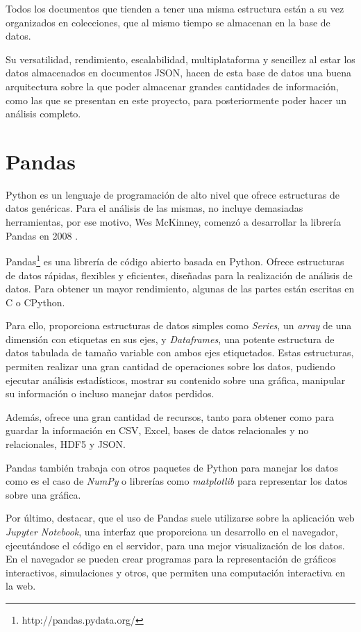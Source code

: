 \documentclass[a4paper, 12pt]{book}
\begin{document}
Todos los documentos que tienden a tener una misma estructura están a su vez organizados en colecciones, que al mismo tiempo se almacenan en la base de datos.

Su versatilidad, rendimiento, escalabilidad, multiplataforma y sencillez al estar los datos almacenados en documentos JSON, hacen de esta base de datos una buena arquitectura sobre la que  poder almacenar grandes cantidades de información, como las que se presentan en este proyecto, para posteriormente poder hacer un análisis completo.



\section{Pandas} 
\label{sec:seccion5}
Python es un lenguaje de programación de alto nivel que ofrece estructuras de datos genéricas. Para el análisis de las mismas, no incluye demasiadas herramientas, por ese motivo, Wes McKinney, comenzó a desarrollar la librería Pandas en 2008 \cite{mckinney2012python}.

Pandas\footnote{http://pandas.pydata.org/} es una librería de código abierto basada en Python. Ofrece estructuras de datos rápidas, flexibles y eficientes, diseñadas para la realización de análisis de datos. Para obtener un mayor rendimiento, algunas de las partes están escritas en C o CPython.

Para ello, proporciona estructuras de datos simples como \textit{Series}, un \textit{array} de una dimensión con etiquetas en sus ejes, y \textit{Dataframes}, una potente estructura de datos tabulada de tamaño variable con ambos ejes etiquetados. Estas estructuras, permiten realizar una gran cantidad de operaciones sobre los datos, pudiendo ejecutar análisis estadísticos, mostrar su contenido sobre una gráfica, manipular su información o incluso manejar datos perdidos.

Además, ofrece una gran cantidad de recursos, tanto para obtener como para guardar la información en CSV, Excel, bases de datos relacionales y no relacionales, HDF5 y JSON.

Pandas también trabaja con otros paquetes de Python para manejar los datos como es el caso de \textit{NumPy} o librerías como \textit{matplotlib} para representar los datos sobre una gráfica.

Por último, destacar, que el uso de Pandas suele utilizarse sobre la aplicación web \textit{Jupyter Notebook}, una interfaz que proporciona un desarrollo en el navegador, ejecutándose el código en el servidor, para una mejor visualización de los datos. En el navegador se pueden crear programas para la representación de gráficos interactivos, simulaciones y otros, que permiten una computación interactiva en la web.
\end{document}
